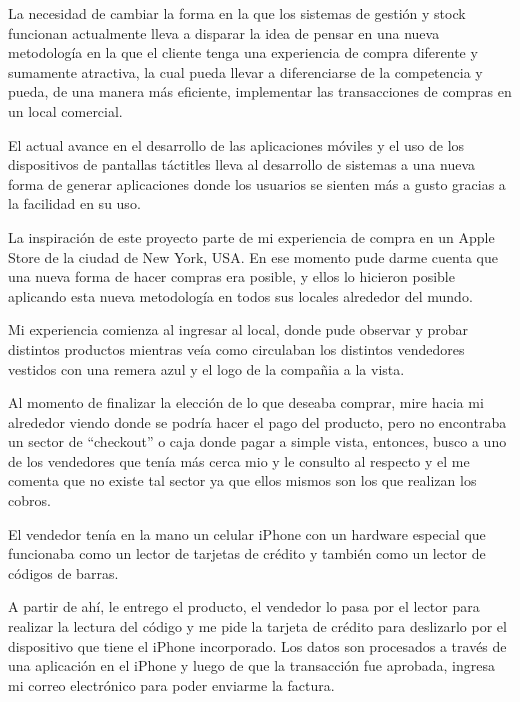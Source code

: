 
La necesidad de cambiar la forma en la que los sistemas de gesti\'on y stock funcionan actualmente lleva a disparar la idea de pensar en una nueva metodolog\'ia en la que el cliente tenga una experiencia de compra diferente y sumamente atractiva, la cual pueda llevar a diferenciarse de la competencia y pueda, de una manera m\'as eficiente, implementar las transacciones de compras en un local comercial.

El actual avance en el desarrollo de las aplicaciones m\'oviles y el uso de los dispositivos de pantallas t\'actitles lleva al desarrollo de sistemas a una nueva forma de generar aplicaciones donde los usuarios se sienten m\'as a gusto gracias a la facilidad en su uso.

La inspiraci\'on de este proyecto parte de mi experiencia de compra en un Apple Store de la ciudad de New York, USA. En ese momento pude darme cuenta que una nueva forma de hacer compras era posible, y ellos lo hicieron posible aplicando esta nueva metodolog\'ia en todos sus locales alrededor del mundo.


Mi experiencia comienza al ingresar al local, donde pude observar y probar distintos productos mientras ve\'ia como circulaban los distintos vendedores vestidos con una remera azul y el logo de la compa\~nia a la vista.

Al momento de finalizar la elecci\'on de lo que deseaba comprar, mire hacia mi alrededor viendo donde se podr\'ia hacer el pago del producto, pero no encontraba un sector de ``checkout'' o caja donde pagar a simple vista, entonces, busco a uno de los vendedores que ten\'ia m\'as cerca mio y le consulto al respecto y el me comenta que no existe tal sector ya que ellos mismos son los que realizan los cobros.

El vendedor ten\'ia en la mano un celular iPhone con un hardware especial que funcionaba como un lector de tarjetas de cr\'edito y tambi\'en como un lector de c\'odigos de barras.


A partir de ah\'i, le entrego el producto, el vendedor lo pasa por el lector para realizar la lectura del c\'odigo y me pide la tarjeta de cr\'edito para deslizarlo por el dispositivo que tiene el iPhone incorporado. Los datos son procesados a trav\'es de una aplicaci\'on en el iPhone y luego de que la transacci\'on fue aprobada, ingresa mi correo electr\'onico para poder enviarme la factura.

